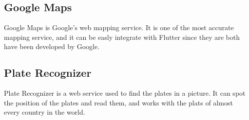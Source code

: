 \documentclass[../ITD.tex]{subfiles}
\begin{document}
    \subsection{Google Maps}\label{subsec:google-maps}
    Google Maps is Google's web mapping service.
    It is one of the most accurate mapping service, and it can be easly integrate with Flutter since they are both have been developed by Google.
    \subsection{Plate Recognizer}\label{subsec:plate-recognizer}
    Plate Recognizer is a web service used to find the plates in a picture.
    It can spot the position of the plates and read them, and works with the plats of almost every country in the world.
\end{document}
